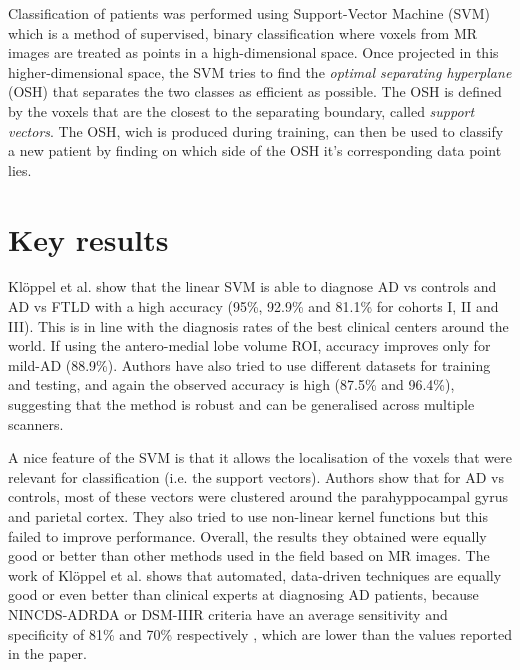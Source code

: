 \documentclass[11pt,a4paper,oneside]{report}
\begin{document}
Classification of patients was performed using Support-Vector Machine (SVM) which is a method of supervised, binary classification where voxels from MR images are treated as points in a high-dimensional space.  \cite{vapnik1998statistical,bishop2006pattern} Once projected in this higher-dimensional space, the SVM tries to find the \emph{optimal separating hyperplane} (OSH) that separates the two classes as efficient as possible. The OSH is defined by the voxels that are the closest to the separating boundary, called \emph{support vectors}. The OSH, wich is produced during training, can then be used to classify a new patient by finding on which side of the OSH it's corresponding data point lies. 

\section*{Key results}

Kl\"{o}ppel et al. \cite{kloppel2008automatic} show that the linear SVM is able to diagnose AD vs controls and AD vs FTLD with a high accuracy (95\%, 92.9\% and 81.1\% for cohorts I, II and III). This is in line with the diagnosis rates of the best clinical centers around the world. \cite{knopman2001practice} If using the antero-medial lobe volume ROI, accuracy improves only for mild-AD (88.9\%). Authors have also tried to use different datasets for training and testing, and again the observed accuracy is high (87.5\% and 96.4\%), suggesting that the method is robust and can be generalised across multiple scanners. 

A nice feature of the SVM is that it allows the localisation of the voxels that were relevant for classification (i.e. the support vectors). Authors show that for AD vs controls, most of these vectors were clustered around the parahyppocampal gyrus and parietal cortex. They also tried to use non-linear kernel functions but this failed to improve performance. Overall, the results they obtained were equally good or better than other methods used in the field based on MR images. \cite{gosche2002hippocampal,jack2002antemortem,barnes2004differentiating,csernansky2004correlations,wahlund2005evidence} The work of Kl\"{o}ppel et al. \cite{kloppel2008automatic} shows that automated, data-driven techniques are equally good or even better than clinical experts at diagnosing AD patients, because NINCDS-ADRDA or DSM-IIIR criteria have an average sensitivity and specificity of 81\% and 70\% respectively \cite{knopman2001practice}, which are lower than the values reported in the paper. 
\end{document}
